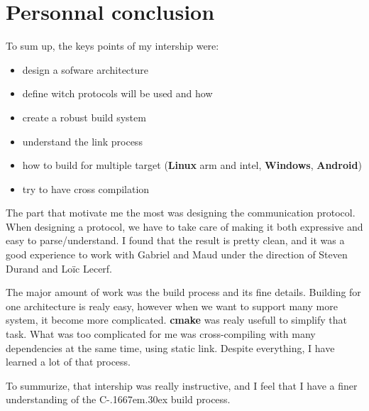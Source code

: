 \documentclass[a4paper,11pt]{custom}
\newcommand{\cmake}{\textbf{cmake}}
\newcommand{\linux}{\textbf{Linux}}
\newcommand{\win}{\textbf{Windows}}
\newcommand{\android}{\textbf{Android}}
\newcommand{\cpp}{%
  C\kern-.1667em\raise.30ex\hbox{\smaller{++}}%
  \spacefactor1000%
}
\begin{document}
\chapter{Personnal conclusion}

To sum up, the keys points of my intership were:
\begin{multicols}{2}
\begin{itemize}
\item design a sofware architecture
\item define witch protocols will be used and how
\item create a robust build system
\item understand the link process
\item how to build for multiple target (\linux{} arm and intel, \win, \android)
\item try to have cross compilation
\end{itemize}
\end{multicols}

The part that motivate me the most was designing the communication protocol.
When designing a protocol, we have to take care of making it both expressive and
easy to parse/understand. I found that the result is pretty clean, and it was a
good experience to work with Gabriel and Maud under the direction of Steven
Durand and Loïc Lecerf.

The major amount of work was the build process and its fine details. Building
for one architecture is realy easy, however when we want to support many more
system, it become more complicated. \cmake{} was realy usefull to simplify that
task. What was too complicated for me was cross-compiling with many dependencies
at the same time, using static link. Despite everything, I have learned a lot of
that process.

To summurize, that intership was really instructive, and I feel that I have a
finer understanding of the \cpp{} build process.
\end{document}

